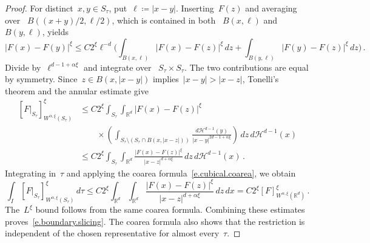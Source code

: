 \documentclass[11pt,letterpaper]{article}
\numberwithin{equation}{section}
\theoremstyle{definition}
\newcommand{\Rd}{\mathbb{R}^d}
\begin{document}
\begin{proof}
For distinct~$x,y\in S_\tau$, put~$\ell\coloneqq|x-y|$.
Inserting~$F(z)$ and averaging over
~$B((x+y)/2,\ell/2)$, which is contained in both
~$B(x,\ell)$ and~$B(y,\ell)$, yields
\begin{equation*}
	|F(x)-F(y)|^\xi
	\leq C2^\xi\ell^{-d}\biggl(
	\int_{B(x,\ell)}|F(x)-F(z)|^\xi\,dz
	+\int_{B(y,\ell)}|F(y)-F(z)|^\xi\,dz
	\biggr)
	\,.
\end{equation*}
Divide by~$\ell^{d-1+\alpha\xi}$ and integrate over
~$S_\tau\times S_\tau$.
The two contributions are equal by symmetry.
Since~$z\in B(x,|x-y|)$ implies~$|x-y|>|x-z|$,
Tonelli's theorem and the annular estimate give
\begin{equation*}
    \begin{aligned}
        [F|_{S_\tau}]_{W^{\alpha,\xi}(S_\tau)}^\xi
        &\leq C2^\xi
        \int_{S_\tau}\int_{\Rd}|F(x)-F(z)|^\xi \\
        &\qquad\times
        \left(
            \int_{S_\tau\setminus(S_\tau\cap B(x,|x-z|))}
            \frac{d\mathcal H^{d-1}(y)}{|x-y|^{2d-1+\alpha\xi}}
        \right)\,dz\,d\mathcal H^{d-1}(x) \\
        &\leq C2^\xi
        \int_{S_\tau}\int_{\Rd}
        \frac{|F(x)-F(z)|^\xi}{|x-z|^{d+\alpha\xi}}
        \,dz\,d\mathcal H^{d-1}(x)
        \,.
    \end{aligned}
\end{equation*}
Integrating in~$\tau$ and applying the coarea formula~\eqref{e.cubical.coarea}, we obtain
\begin{equation*}
    \int_I
    [F|_{S_\tau}]_{W^{\alpha,\xi}(S_\tau)}^\xi\,d\tau
    \leq C2^\xi
    \int_{\Rd}\int_{\Rd}
    \frac{|F(x)-F(z)|^\xi}{|x-z|^{d+\alpha\xi}}
    \,dz\,dx
    =C2^\xi[F]_{W^{\alpha,\xi}(\Rd)}^\xi
    \,.
\end{equation*}
The~$L^\xi$ bound follows from the same coarea formula.
Combining these estimates proves~\eqref{e.boundary.slicing}.
The coarea formula also shows that the restriction is independent
of the chosen representative for almost every~$\tau$.
\end{proof}
\end{document}
